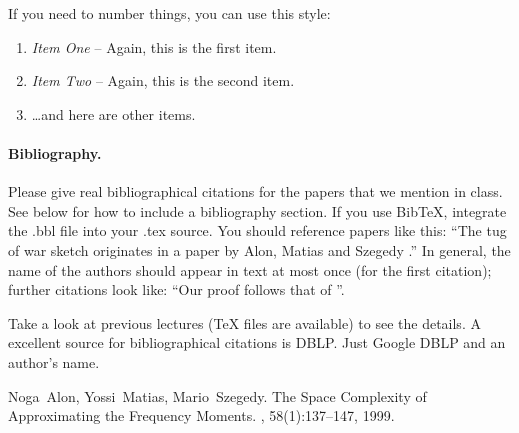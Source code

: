 \documentclass[11pt]{article}
\begin{document}
If you need to number things, you can use this style:
\begin{enumerate}
\item {\em Item One} -- Again, this is the first item.
\item {\em Item Two} -- Again, this is the second item.
\item \dots and here are other items.
\end{enumerate}

\paragraph{Bibliography.}
Please give real bibliographical citations for the papers that we
mention in class. See below for how to include a bibliography section.
If you use BibTeX, integrate the .bbl file into your .tex
source. You should reference papers like this: ``The tug of war sketch
originates in a paper by Alon, Matias and Szegedy \cite{AlonMS99}.''
In general, the name of the authors should appear in text at most once 
(for the first citation); further citations look like: ``Our proof follows 
that of \cite{AlonMS99}''.

Take a look at previous lectures (TeX files are available) to see the
details. A excellent source for bibliographical citations is
DBLP. Just Google DBLP and an author's name.




\begin{thebibliography}{42}

Noga~Alon, Yossi~Matias, Mario~Szegedy.
\newblock The Space Complexity of Approximating the Frequency Moments.
, 58(1):137--147, 1999.

\end{thebibliography}
\end{document}
